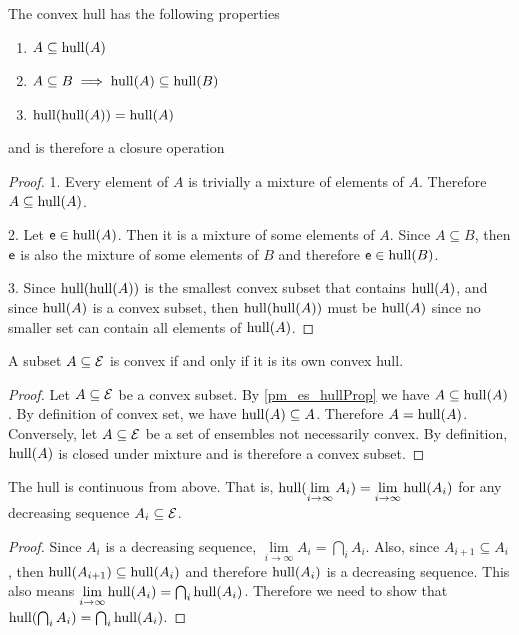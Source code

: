\begin{mathSection}
\begin{coro}\label{pm_es_hullProp}
	The convex hull has the following properties
	\begin{enumerate}
		\item $A \subseteq \mathrm{hull}(A)$
		\item $A \subseteq B \implies \mathrm{hull}(A) \subseteq \mathrm{hull}(B)$
		\item $\mathrm{hull}(\mathrm{hull}(A)) = \mathrm{hull}(A)$
	\end{enumerate}
	and is therefore a closure operation
\end{coro}

\begin{proof}
	1. Every element of $A$ is trivially a mixture of elements of $A$. Therefore $A \subseteq \mathrm{hull}(A)$.
	
	2. Let $\mathsf{e} \in \mathrm{hull}(A)$. Then it is a mixture of some elements of $A$. Since $A \subseteq B$, then $\mathsf{e}$ is also the mixture of some elements of $B$ and therefore $\mathsf{e} \in \mathrm{hull}(B)$.
	
	3. Since $\mathrm{hull}(\mathrm{hull}(A))$ is the smallest convex subset that contains $\mathrm{hull}(A)$, and since $\mathrm{hull}(A)$ is a convex subset, then $\mathrm{hull}(\mathrm{hull}(A))$ must be $\mathrm{hull}(A)$ since no smaller set can contain all elements of $\mathrm{hull}(A)$.
\end{proof}

\begin{coro}
	A subset $A \subseteq \mathcal{E}$ is convex if and only if it is its own convex hull.
\end{coro}

\begin{proof}
	Let $A \subseteq \mathcal{E}$ be a convex subset. By \ref{pm_es_hullProp} we have $A \subseteq \mathrm{hull}(A)$. By definition of convex set, we have $\mathrm{hull}(A) \subseteq A$. Therefore $A = \mathrm{hull}(A)$. Conversely, let $A \subseteq \mathcal{E}$ be a set of ensembles not necessarily convex. By definition, $\mathrm{hull}(A)$ is closed under mixture and is therefore a convex subset.
\end{proof}

\begin{prop}
	The hull is continuous from above. That is, $\mathrm{hull}(\lim\limits_{i \to \infty} A_i) = \lim\limits_{i \to \infty} \mathrm{hull}(A_i)$ for any decreasing sequence $A_i \subseteq \mathcal{E}$.
\end{prop}

\begin{proof}
	Since $A_i$ is a decreasing sequence, $\lim\limits_{i \to \infty} A_i = \bigcap_i A_i$. Also, since $A_{i+1} \subseteq A_i$, then $\mathrm{hull}(A_{i+1}) \subseteq \mathrm{hull}(A_i)$ and therefore $\mathrm{hull}(A_i)$ is a decreasing sequence. This also means $\lim\limits_{i \to \infty} \mathrm{hull}(A_i) = \bigcap_i \mathrm{hull}(A_i)$. Therefore we need to show that $\mathrm{hull}(\bigcap_i A_i) = \bigcap_i \mathrm{hull}(A_i)$.
	

\end{proof}
\end{mathSection}
